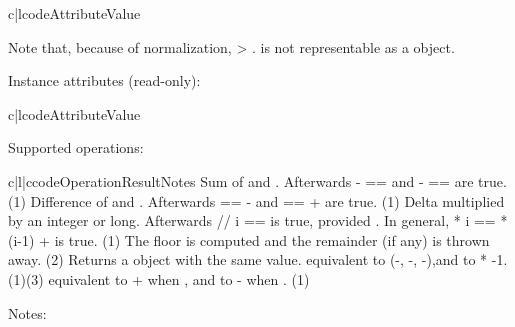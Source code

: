 \begin{tableii}{c|l}{code}{Attribute}{Value}
\end{tableii}

Note that, because of normalization,  \textgreater
{}.   is not representable as
a  object.

Instance attributes (read-only):

\begin{tableii}{c|l}{code}{Attribute}{Value}
\end{tableii}

Supported operations:

\begin{tableiii}{c|l|c}{code}{Operation}{Result}{Notes}
          {Sum of  and .
           Afterwards - ==  and -
           ==  are true.}
          {(1)}
          {Difference of  and . Afterwards  ==
            -  and  ==  +  are
           true.}
          {(1)}
          {Delta multiplied by an integer or long.
           Afterwards  // i ==  is true, provided .
           In general,  * i ==  * (i-1) +  is true.}
          {(1)}
          {The floor is computed and the remainder (if any) is thrown away.}
          {(2)}
          {Returns a  object with the same value.}
          {}
          {equivalent to (-, -,
           -),and to * -1.}
          {(1)(3)}
          {equivalent to + when , and to - when
           .}
          {(1)}


\end{tableiii}
\noindent
Notes:

